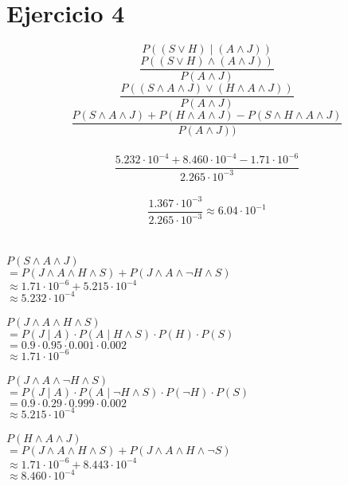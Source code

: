 \documentclass {article}
\begin{document}
\clearpage
\section {Ejercicio 4}

$$P ( (S \lor H) \mid (A \land J) )$$
$$\frac
	{P ( (S \lor H) \land (A \land J) )}
	{P (A \land J)}$$
$$\frac
	{P ( (S \land A \land J) \lor (H \land A \land J) )}
	{P(A \land J)}$$
$$\frac
	{P (S \land A \land J) + P(H \land A \land J) -P(S\land H \land A \land J)}
	{P(A \land J) )}$$\\
$$\frac
	{5.232 \cdot 10^{-4} + 8.460 \cdot 10^{-4} - 1.71 \cdot 10^{-6}}
	{2.265 \cdot 10^{-3}}$$\\
$$\frac
	{1.367 \cdot 10^{-3}}
	{2.265 \cdot 10^{-3}}
	\approx 6.04 \cdot 10^{-1}$$\\
\\
$P (S \land A \land J)$\\
	\indent $ 
		= P (J \land A \land H \land S) 
		+ P (J \land A \land \neg H \land S)$\\
	\indent $ 
		\approx 1.71 \cdot 10^{-6} 
		+ 5.215 \cdot 10^{-4} $\\
	\indent $ 
		\approx 5.232 \cdot 10^{-4}$\\
\\
$P (J \land A \land H \land S)$\\
	\indent $ 
		= P(J \mid A) 
		\cdot P(A \mid H \land S) 
		\cdot P (H) 
		\cdot P (S) $\\
	\indent $ 
		= 0.9 
		\cdot 0.95 
		\cdot 0.001 
		\cdot 0.002$\\
	\indent $ 
		\approx 1.71 
		\cdot 10^{-6}$\\
\\
$P (J \land A \land \neg H \land S)$\\
	\indent $ 
		= P(J \mid A) 
		\cdot P(A \mid \neg H \land S) 
		\cdot P (\neg H) 
		\cdot P (S) $\\
	\indent $ 
		= 0.9 
		\cdot 0.29 
		\cdot 0.999 
		\cdot 0.002$\\
	\indent $ 
		\approx 5.215 \cdot 10^{-4}$\\
\\
$P (H \land A \land J)$\\
	\indent $ 
		= P (J \land A \land H \land S) 
		+ P (J \land A \land H \land \neg S)$\\
	\indent $ 
		\approx 1.71 \cdot 10^{-6} 
		+ 8.443 \cdot 10^{-4} $\\
	\indent $ 
		\approx 8.460 \cdot 10^{-4}$\\
\\
\end{document}
